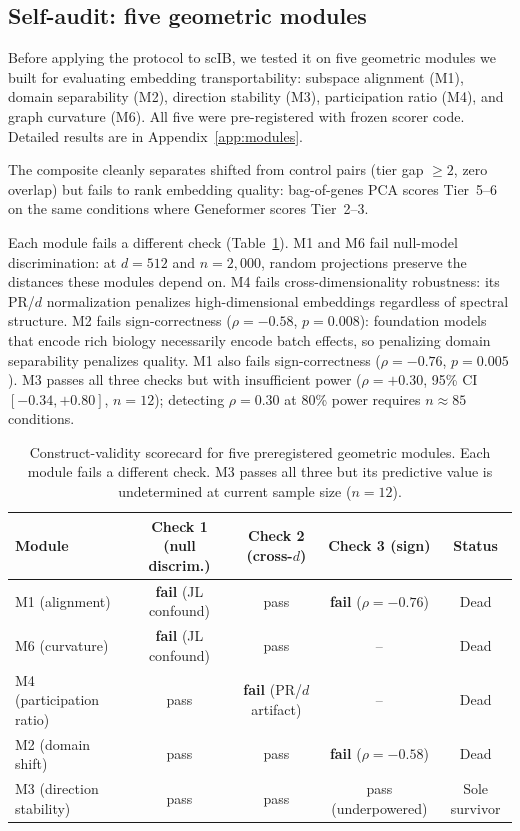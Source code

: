 \documentclass[11pt]{article}
\begin{document}
\subsection{Self-audit: five geometric modules}
\label{sec:modules}

Before applying the protocol to scIB, we tested it on five geometric modules we built for evaluating embedding transportability: subspace alignment (M1), domain separability (M2), direction stability (M3), participation ratio (M4), and graph curvature (M6). All five were pre-registered with frozen scorer code. Detailed results are in Appendix~\ref{app:modules}.

The composite cleanly separates shifted from control pairs (tier gap $\geq 2$, zero overlap) but fails to rank embedding quality: bag-of-genes PCA scores Tier~5--6 on the same conditions where Geneformer scores Tier~2--3.

Each module fails a different check (Table~\ref{tab:scorecard}). M1 and M6 fail null-model discrimination: at $d = 512$ and $n = 2{,}000$, random projections preserve the distances these modules depend on. M4 fails cross-dimensionality robustness: its PR/$d$ normalization penalizes high-dimensional embeddings regardless of spectral structure. M2 fails sign-correctness ($\rho = -0.58$, $p = 0.008$): foundation models that encode rich biology necessarily encode batch effects, so penalizing domain separability penalizes quality. M1 also fails sign-correctness ($\rho = -0.76$, $p = 0.005$). M3 passes all three checks but with insufficient power ($\rho = +0.30$, 95\% CI $[-0.34, +0.80]$, $n = 12$); detecting $\rho = 0.30$ at 80\% power requires $n \approx 85$ conditions.

\begin{table}[t]
\centering
\caption{Construct-validity scorecard for five preregistered geometric modules. Each module fails a different check. M3 passes all three but its predictive value is undetermined at current sample size ($n = 12$).}
\label{tab:scorecard}
\small
\begin{tabular}{@{}lcccc@{}}
\toprule
Module & Check 1 (null discrim.) & Check 2 (cross-$d$) & Check 3 (sign) & Status \\
\midrule
M1 (alignment) & \textbf{fail} (JL confound) & pass & \textbf{fail} ($\rho = -0.76$) & Dead \\
M6 (curvature) & \textbf{fail} (JL confound) & pass & -- & Dead \\
M4 (participation ratio) & pass & \textbf{fail} (PR/$d$ artifact) & -- & Dead \\
M2 (domain shift) & pass & pass & \textbf{fail} ($\rho = -0.58$) & Dead \\
M3 (direction stability) & pass & pass & pass (underpowered) & Sole survivor \\
\bottomrule
\end{tabular}
\end{table}
\end{document}
